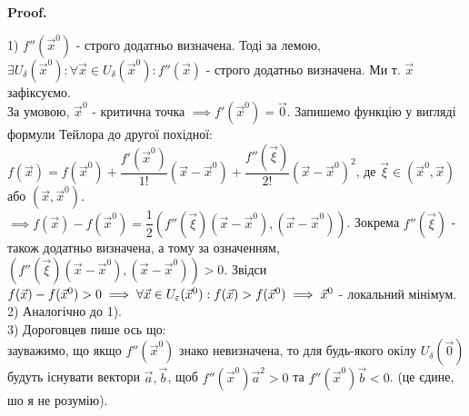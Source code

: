 \documentclass[a4paper, 10pt]{article}
\makeatletter
\def\qed{$\blacksquare$}
\theoremstyle{theoremdd}
\theoremstyle{theoremdd}
\theoremstyle{theoremdd}
\theoremstyle{theoremdd}
\theoremstyle{theoremdd}
\theoremstyle{theoremdd}
\theoremstyle{theoremdd}
\theoremstyle{theoremdd}
\renewenvironment{proof}[1][Proof.\\]{\par
\pushQED{\hfill \qed}%
\normalfont \topsep6\p@\@plus6\p@\relax
\trivlist
\item\relax
{\bfseries
#1\@addpunct{.}}\hspace\labelsep\ignorespaces
}{%
\popQED\endtrivlist\@endpefalse
}
\makeatother
\begin{document}
\begin{proof}
1) $f''(\vec{x}^0)$ - строго додатньо визначена. Тоді за лемою, $\exists U_{\delta}(\vec{x}^0): \forall \vec{x} \in U_{\delta}(\vec{x}^0): f''(\vec{x})$ - строго додатньо визначена. Ми т. $\vec{x}$ зафіксуємо.\\
За умовою, $\vec{x}^0$ - критична точка $\implies f'(\vec{x}^0) = \vec{0}$. Запишемо функцію у вигляді формули Тейлора до другої похідної:\\
$f(\vec{x}) = f(\vec{x}^0) + \dfrac{f'(\vec{x}^0)}{1!}(\vec{x}-\vec{x}^0) + \dfrac{f''(\vec{\xi})}{2!}(\vec{x}-\vec{x}^0)^2$, де $\vec{\xi} \in (\vec{x}^0,\vec{x})$ або $(\vec{x},\vec{x}^0)$.\\
$\implies f(\vec{x}) - f(\vec{x}^0) = \dfrac{1}{2} \left(f''(\vec{\xi})(\vec{x}-\vec{x}^0), (\vec{x}-\vec{x}^0) \right)$. Зокрема $f''(\vec{\xi})$ - також додатньо визначена, а тому за означенням, $\left( f''(\vec{\xi})(\vec{x}-\vec{x}^0),(\vec{x}-\vec{x}^0) \right) > 0$. Звідси $f(\vec{x})-f(\vec{x}^0) > 0 \\ \implies \forall \vec{x} \in U_{\varepsilon}(\vec{x}^0): f(\vec{x}) > f(\vec{x}^0) \implies \vec{x}^0$ - локальний мінімум.
\bigskip \\

2) Аналогічно до 1).
\bigskip \\

3) Дороговцев пише ось що:\\
зауважимо, що якщо $f''(\vec{x}^0)$ знако невизначена, то для будь-якого окілу $U_\delta (\vec{0})$ будуть існувати вектори $\vec{a}, \vec{b}$, щоб $f''(\vec{x}^0) \vec{a}^2 > 0$ та $f''(\vec{x}^0) \vec{b} < 0$. (це єдине, шо я не розумію).

\end{proof}
\end{document}
